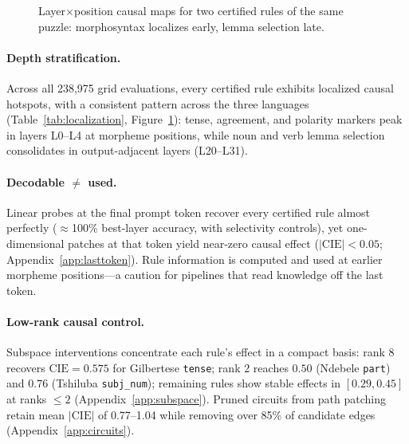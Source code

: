 \begin{figure}[t]
\centering
\caption{Layer$\times$position causal maps for two certified rules of the
same puzzle: morphosyntax localizes early, lemma selection late.}
\label{fig:heatmaps}
\end{figure}

\paragraph{Depth stratification.} Across all 238{,}975 grid evaluations,
every certified rule exhibits localized causal hotspots, with a consistent
pattern across the three languages (Table~\ref{tab:localization},
Figure~\ref{fig:heatmaps}): tense, agreement, and polarity markers peak in
layers L0--L4 at morpheme positions, while noun and verb lemma selection
consolidates in output-adjacent layers (L20--L31).

\paragraph{Decodable $\neq$ used.} Linear probes at the final prompt token
recover every certified rule almost perfectly ($\approx$100\% best-layer
accuracy, with selectivity controls), yet one-dimensional patches at that
token yield near-zero causal effect ($|\mathrm{CIE}|<0.05$;
Appendix~\ref{app:lasttoken}). Rule information is computed and used at
earlier morpheme positions---a caution for pipelines that read knowledge
off the last token.

\paragraph{Low-rank causal control.} Subspace interventions concentrate
each rule's effect in a compact basis: rank 8 recovers
$\mathrm{CIE}=0.575$ for Gilbertese \texttt{tense}; rank 2 reaches
$0.50$ (Ndebele \texttt{part}) and $0.76$ (Tshiluba \texttt{subj\_num});
remaining rules show stable effects in $[0.29,0.45]$ at ranks $\le 2$
(Appendix~\ref{app:subspace}). Pruned circuits from path patching retain
mean $|\mathrm{CIE}|$ of 0.77--1.04 while removing over 85\% of candidate
edges (Appendix~\ref{app:circuits}).

